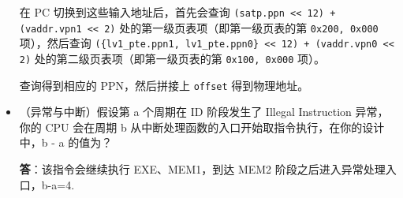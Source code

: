 \documentclass[12pt,a4paper,oneside]{ctexart}
\begin{document}
\begin{itemize}
    在 PC 切换到这些输入地址后，首先会查询 \texttt{(satp.ppn << 12) + (vaddr.vpn1 << 2)} 处的第一级页表项（即第一级页表的第 \texttt{0x200, 0x000} 项），然后查询 \texttt{(\{lv1\_pte.ppn1, lv1\_pte.ppn0\} << 12) + (vaddr.vpn0 << 2)} 处的第二级页表项（即第一级页表的第 \texttt{0x100, 0x000} 项）。
    
    查询得到相应的 PPN，然后拼接上 \texttt{offset} 得到物理地址。

    \item （异常与中断）假设第 a 个周期在 ID 阶段发生了 Illegal Instruction 异常，你的 CPU 会在周期 b 从中断处理函数的入口开始取指令执行，在你的设计中，b - a 的值为？
    
    \textbf{答}：该指令会继续执行 EXE、MEM1，到达 MEM2 阶段之后进入异常处理入口，b-a=4.
\end{itemize}
\end{document}
